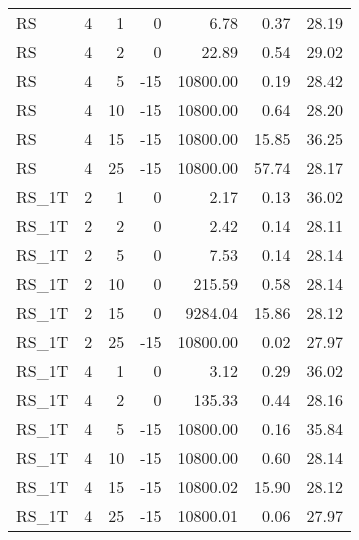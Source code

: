 \begin{center}
\begin{longtable}{lrrrrrr}
  RS     & 4 & 1 &   0 & 6.78 & 0.37 & 28.19 \\ 
  RS     & 4 & 2 &   0 & 22.89 & 0.54 & 29.02 \\ 
  RS     & 4 & 5 & -15 & 10800.00 & 0.19 & 28.42 \\ 
  RS     & 4 & 10 & -15 & 10800.00 & 0.64 & 28.20 \\ 
  RS     & 4 & 15 & -15 & 10800.00 & 15.85 & 36.25 \\ 
  RS     & 4 & 25 & -15 & 10800.00 & 57.74 & 28.17 \\ 
  RS\_1T     & 2 & 1 &   0 & 2.17 & 0.13 & 36.02 \\ 
  RS\_1T     & 2 & 2 &   0 & 2.42 & 0.14 & 28.11 \\ 
  RS\_1T     & 2 & 5 &   0 & 7.53 & 0.14 & 28.14 \\ 
  RS\_1T     & 2 & 10 &   0 & 215.59 & 0.58 & 28.14 \\ 
  RS\_1T     & 2 & 15 &   0 & 9284.04 & 15.86 & 28.12 \\ 
  RS\_1T     & 2 & 25 & -15 & 10800.00 & 0.02 & 27.97 \\ 
  RS\_1T     & 4 & 1 &   0 & 3.12 & 0.29 & 36.02 \\ 
  RS\_1T     & 4 & 2 &   0 & 135.33 & 0.44 & 28.16 \\ 
  RS\_1T     & 4 & 5 & -15 & 10800.00 & 0.16 & 35.84 \\ 
  RS\_1T     & 4 & 10 & -15 & 10800.00 & 0.60 & 28.14 \\ 
  RS\_1T     & 4 & 15 & -15 & 10800.02 & 15.90 & 28.12 \\ 
  RS\_1T     & 4 & 25 & -15 & 10800.01 & 0.06 & 27.97 \\ 
\end{longtable}
\end{center}
